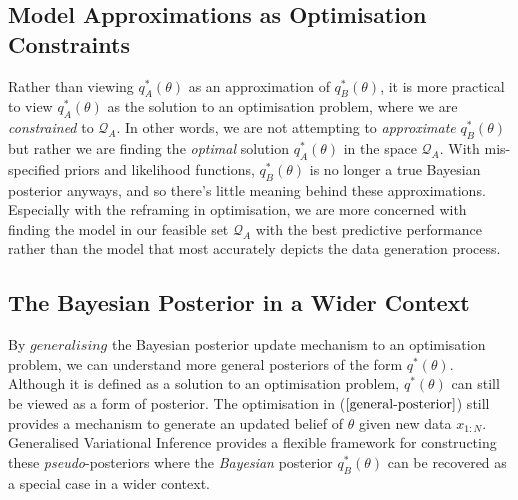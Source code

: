 \documentclass[twoside,11pt]{article}
\newcommand{\jw}[1]{{\color{gray} [JW: #1]}}
\begin{document}
\subsection{Model Approximations as Optimisation Constraints}
Rather than viewing $q_A^*(\theta)$ as an approximation of $q_B^*(\theta)$, it is more practical to view $q_A^*(\theta)$ as the solution to an optimisation problem, where we are \textit{constrained} to $\mathcal{Q}_{A}$. In other words, we are not attempting to \textit{approximate} $q_B^*(\theta)$ but rather we are finding the \textit{optimal} solution $q_A^*(\theta)$ in the space $\mathcal{Q}_{A}$. With mis-specified priors and likelihood functions, $q_B^*(\theta)$  is no longer a true Bayesian posterior anyways, and so there's little meaning behind these approximations. Especially with the reframing in optimisation, we are more concerned with finding the model in our feasible set $\mathcal{Q}_{A}$ with the best predictive performance rather than the model that most accurately depicts the data generation process.
\subsection{The Bayesian Posterior in a Wider Context}
By $\textit{generalising}$ the Bayesian posterior update mechanism to an optimisation problem, we can understand more general posteriors of the form $q^*(\theta)$. Although it is defined as a solution to an optimisation problem, $q^*(\theta)$ can still be viewed as a form of posterior. The optimisation in ($\ref{general-posterior}$) still provides a mechanism to generate an updated belief of $\theta$ given new data $x_{1:N}$. Generalised Variational Inference provides a flexible framework for constructing these \textit{pseudo}-posteriors where the \textit{Bayesian} posterior $q_B^*(\theta)$ can be recovered as a special case in a wider context.



\end{document}
